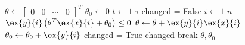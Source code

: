 \documentclass[10pt,oneside]{book}
\begin{document}
\pagestyle{empty}
\thispagestyle{empty}

\begin{codebox}
  \li $\theta \gets 
    \begin{bmatrix}
      0 & 0 & \cdots & 0
    \end{bmatrix}^T$
  \li $\theta_0 \gets 0$
  \li \For $t \gets 1$ \To $\tau$
  \li   \Do
            changed = False
  \li        \For $i \gets 1$ \To $n$
  \li       \Do
              \If $\ex{y}{i}\left(\theta^T\ex{x}{i} + \theta_0\right) \le 0$
  \li           \Then
                  $\theta \gets \theta + \ex{y}{i}\ex{x}{i}$
  \li             $\theta_0 \gets \theta_0 + \ex{y}{i}$
  \li             changed = True
                \End
            \End
  \li      {} changed
  \li          \Then
		  break
      \End
      \End
  \li \Return $\theta, \theta_0$
\end{codebox}
\end{document}
